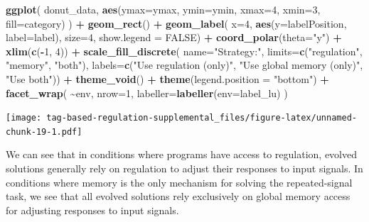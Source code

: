 \documentclass[
]{book}
\newenvironment{Shaded}{\begin{snugshade}}{\end{snugshade}}
\newcommand{\DataTypeTok}[1]{\textcolor[rgb]{0.13,0.29,0.53}{#1}}
\newcommand{\DecValTok}[1]{\textcolor[rgb]{0.00,0.00,0.81}{#1}}
\newcommand{\KeywordTok}[1]{\textcolor[rgb]{0.13,0.29,0.53}{\textbf{#1}}}
\newcommand{\NormalTok}[1]{#1}
\newcommand{\OperatorTok}[1]{\textcolor[rgb]{0.81,0.36,0.00}{\textbf{#1}}}
\newcommand{\OtherTok}[1]{\textcolor[rgb]{0.56,0.35,0.01}{#1}}
\newcommand{\StringTok}[1]{\textcolor[rgb]{0.31,0.60,0.02}{#1}}
\begin{document}
\begin{Shaded}
\begin{Highlighting}[]
\KeywordTok{ggplot}\NormalTok{( donut\_data, }\KeywordTok{aes}\NormalTok{(}\DataTypeTok{ymax=}\NormalTok{ymax, }\DataTypeTok{ymin=}\NormalTok{ymin, }\DataTypeTok{xmax=}\DecValTok{4}\NormalTok{, }\DataTypeTok{xmin=}\DecValTok{3}\NormalTok{, }\DataTypeTok{fill=}\NormalTok{category) ) }\OperatorTok{+}
\StringTok{  }\KeywordTok{geom\_rect}\NormalTok{() }\OperatorTok{+}
\StringTok{  }\KeywordTok{geom\_label}\NormalTok{( }\DataTypeTok{x=}\DecValTok{4}\NormalTok{, }\KeywordTok{aes}\NormalTok{(}\DataTypeTok{y=}\NormalTok{labelPosition, }\DataTypeTok{label=}\NormalTok{label), }\DataTypeTok{size=}\DecValTok{4}\NormalTok{, }\DataTypeTok{show.legend =} \OtherTok{FALSE}\NormalTok{) }\OperatorTok{+}
\StringTok{  }\KeywordTok{coord\_polar}\NormalTok{(}\DataTypeTok{theta=}\StringTok{"y"}\NormalTok{) }\OperatorTok{+}
\StringTok{  }\KeywordTok{xlim}\NormalTok{(}\KeywordTok{c}\NormalTok{(}\OperatorTok{{-}}\DecValTok{1}\NormalTok{, }\DecValTok{4}\NormalTok{)) }\OperatorTok{+}
\StringTok{  }\KeywordTok{scale\_fill\_discrete}\NormalTok{(}
    \DataTypeTok{name=}\StringTok{"Strategy:"}\NormalTok{,}
    \DataTypeTok{limits=}\KeywordTok{c}\NormalTok{(}\StringTok{"regulation"}\NormalTok{,}
             \StringTok{"memory"}\NormalTok{,}
             \StringTok{"both"}\NormalTok{),}
    \DataTypeTok{labels=}\KeywordTok{c}\NormalTok{(}\StringTok{"Use regulation (only)"}\NormalTok{,}
             \StringTok{"Use global memory (only)"}\NormalTok{,}
             \StringTok{"Use both"}\NormalTok{)) }\OperatorTok{+}
\StringTok{  }\KeywordTok{theme\_void}\NormalTok{() }\OperatorTok{+}
\StringTok{  }\KeywordTok{theme}\NormalTok{(}\DataTypeTok{legend.position =} \StringTok{"bottom"}\NormalTok{) }\OperatorTok{+}
\StringTok{  }\KeywordTok{facet\_wrap}\NormalTok{(}
    \OperatorTok{\textasciitilde{}}\NormalTok{env,}
    \DataTypeTok{nrow=}\DecValTok{1}\NormalTok{,}
    \DataTypeTok{labeller=}\KeywordTok{labeller}\NormalTok{(}\DataTypeTok{env=}\NormalTok{label\_lu)}
\NormalTok{  )}
\end{Highlighting}
\end{Shaded}

\texttt{[image: tag-based-regulation-supplemental\_files/figure-latex/unnamed-chunk-19-1.pdf]}

We can see that in conditions where programs have access to regulation, evolved solutions generally rely on regulation to adjust their responses to input signals.
In conditions where memory is the only mechanism for solving the repeated-signal task, we see that all evolved solutions rely exclusively on global memory access for adjusting responses to input signals.
\end{document}
